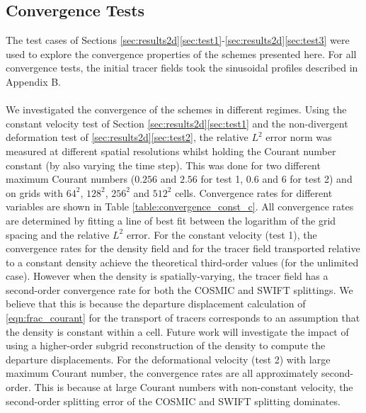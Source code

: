 \documentclass{ametsocV6.1}
\begin{document}
\subsection{Convergence Tests} \label{sec:convergence}
The test cases of Sections \ref{sec:results2d}\ref{sec:test1}-\ref{sec:results2d}\ref{sec:test3} were used to explore the convergence properties of the schemes presented here.
For all convergence tests, the initial tracer fields took the sinusoidal profiles described in Appendix B. \\
\\
We investigated the convergence of the schemes in different regimes.
Using the constant velocity test of Section \ref{sec:results2d}\ref{sec:test1} and the non-divergent deformation test of \ref{sec:results2d}\ref{sec:test2}, the relative $L^2$ error norm was measured at different spatial resolutions whilst holding the Courant number constant (by also varying the time step).
This was done for two different maximum Courant numbers ($0.256$ and $2.56$ for test 1, $0.6$ and $6$ for test 2) and on grids with $64^2$, $128^2$, $256^2$ and $512^2$ cells.
Convergence rates for different variables are shown in Table \ref{table:convergence_const_c}.
All convergence rates are determined by fitting a line of best fit between the logarithm of the grid spacing and the relative $L^2$ error.
For the constant velocity (test 1), the convergence rates for the density field and for the tracer field transported relative to a constant density achieve the theoretical third-order values (for the unlimited case).
However when the density is spatially-varying, the tracer field has a second-order convergence rate for both the COSMIC and SWIFT splittings.
We believe that this is because the departure displacement calculation of \eqref{eqn:frac_courant} for the transport of tracers corresponds to an assumption that the density is constant within a cell.
Future work will investigate the impact of using a higher-order subgrid reconstruction of the density to compute the departure displacements.
For the deformational velocity (test 2) with large maximum Courant number, the convergence rates are all approximately second-order. This is because at large Courant numbers with non-constant velocity, the second-order splitting error of the COSMIC and SWIFT splitting dominates. 
\\
\end{document}

